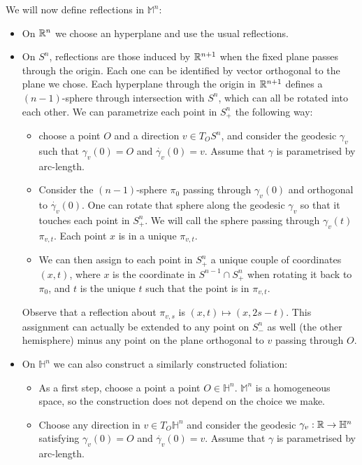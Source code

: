 We will now define reflections in $\mathbb{M}^n$: 

\begin{itemize}	
	\item On $\mathbb{R}^n$ we choose an hyperplane and use the usual reflections.  
	\item On  $S^n$, reflections are those induced by $\mathbb{R}^{n+1}$ when the fixed plane passes through the origin. Each one can be identified by vector orthogonal to the plane we chose. Each hyperplane through the origin in $\mathbb{R}^{n+1}$ defines a $(n-1)$-sphere through intersection with $S^n$, which can all be rotated into each other. We can parametrize each point in $S^n_+$ the following way: 
	\begin{itemize}
		\item choose a point $O$ and a direction $v\in T_O S^n$, and consider the geodesic $\gamma_v$ such that $\gamma_v (0) = O$ and $\dot{\gamma_v} (0) = v$. Assume that $\gamma$ is parametrised by arc-length. 
		\item Consider the $(n-1)$-sphere $\pi_0$ passing through $\gamma_v(0)$ and orthogonal to  $\dot{\gamma_v}(0)$. One can rotate that sphere along the geodesic $\gamma_v$ so that it touches each point in $S^n_+$. We will call the sphere passing through $\gamma_v(t)$ $\pi_{v, t}$. Each point $x$ is in a unique $\pi_{v, t}$.
		\item We can then assign to each point in $S^n_+$ a unique couple of coordinates $(x, t)$, where $x$ is the coordinate in $S^{n-1}\cap S^n_+$ when rotating it back to $\pi_0$, and $t$ is the unique $t$ such that the point is in $\pi_{v, t}$.
	\end{itemize}
	Observe that a reflection about $\pi_{v, s}$ is $(x, t) \mapsto (x, 2s-t)$. This assignment can actually be extended to any point on $S^n_-$ as well (the other hemisphere) minus any point on the plane orthogonal to $v$ passing through $O$.
	\item On $\mathbb{H}^n$ we can also construct a similarly constructed foliation: 
	\begin{itemize}	
		\item As a first step, choose a point a point $O \in \mathbb{H}^n$. $\mathbb{M}^n$ is a homogeneous space, so the construction does not depend on the choice we make.
		\item Choose any direction in $v\in T_O\mathbb{H}^n$ and consider the geodesic $\gamma_v: \mathbb{R} \rightarrow \mathbb{H}^n$ satisfying $\gamma_v (0) = O$ and $\dot{\gamma_v} (0) = v$. Assume that $\gamma$ is parametrised by arc-length. 

\end{itemize}
\end{itemize}
